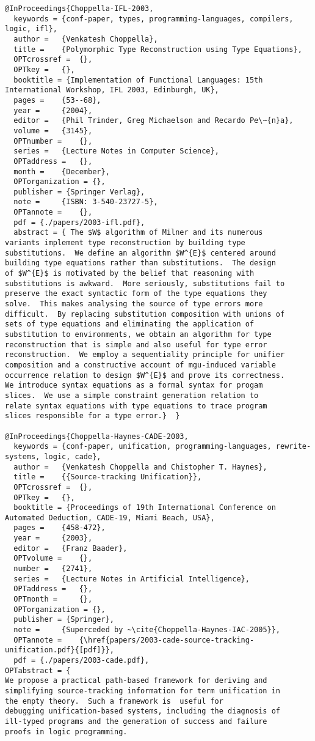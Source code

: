 \documentclass[11pt]{article}
\begin{document}
\begin{lstlisting}
@InProceedings{Choppella-IFL-2003,
  keywords = {conf-paper, types, programming-languages, compilers, logic, ifl},
  author = 	 {Venkatesh Choppella},
  title = 	 {Polymorphic Type Reconstruction using Type Equations},
  OPTcrossref =  {},
  OPTkey = 	 {},
  booktitle = {Implementation of Functional Languages: 15th International Workshop, IFL 2003, Edinburgh, UK},
  pages = 	 {53--68},
  year = 	 {2004},
  editor = 	 {Phil Trinder, Greg Michaelson and Recardo Pe\~{n}a},
  volume = 	 {3145},
  OPTnumber = 	 {},
  series = 	 {Lecture Notes in Computer Science},
  OPTaddress = 	 {},
  month = 	 {December},
  OPTorganization = {},
  publisher = {Springer Verlag},
  note = 	 {ISBN: 3-540-23727-5},
  OPTannote = 	 {},
  pdf = {./papers/2003-ifl.pdf},
  abstract = { The $W$ algorithm of Milner and its numerous
variants implement type reconstruction by building type
substitutions.  We define an algorithm $W^{E}$ centered around
building type equations rather than substitutions.  The design
of $W^{E}$ is motivated by the belief that reasoning with
substitutions is awkward.  More seriously, substitutions fail to
preserve the exact syntactic form of the type equations they
solve.  This makes analysing the source of type errors more
difficult.  By replacing substitution composition with unions of
sets of type equations and eliminating the application of
substitution to environments, we obtain an algorithm for type
reconstruction that is simple and also useful for type error
reconstruction.  We employ a sequentiality principle for unifier
composition and a constructive account of mgu-induced variable
occurrence relation to design $W^{E}$ and prove its correctness.
We introduce syntax equations as a formal syntax for progam
slices.  We use a simple constraint generation relation to
relate syntax equations with type equations to trace program
slices responsible for a type error.}  } 

@InProceedings{Choppella-Haynes-CADE-2003,
  keywords = {conf-paper, unification, programming-languages, rewrite-systems, logic, cade},
  author = 	 {Venkatesh Choppella and Chistopher T. Haynes},
  title = 	 {{Source-tracking Unification}},
  OPTcrossref =  {},
  OPTkey = 	 {},
  booktitle = {Proceedings of 19th International Conference on Automated Deduction, CADE-19, Miami Beach, USA},
  pages = 	 {458-472},
  year = 	 {2003},
  editor = 	 {Franz Baader},
  OPTvolume = 	 {},
  number = 	 {2741},
  series = 	 {Lecture Notes in Artificial Intelligence},
  OPTaddress = 	 {},
  OPTmonth = 	 {},
  OPTorganization = {},
  publisher = {Springer},
  note = 	 {Superceded by ~\cite{Choppella-Haynes-IAC-2005}},
  OPTannote = 	 {\href{papers/2003-cade-source-tracking-unification.pdf}{[pdf]}},
  pdf = {./papers/2003-cade.pdf},
OPTabstract = {
We propose a practical path-based framework for deriving and
simplifying source-tracking information for term unification in
the empty theory.  Such a framework is  useful for
debugging unification-based systems, including the diagnosis of
ill-typed programs and the generation of success and failure
proofs in logic programming.


\end{lstlisting}
\end{document}
